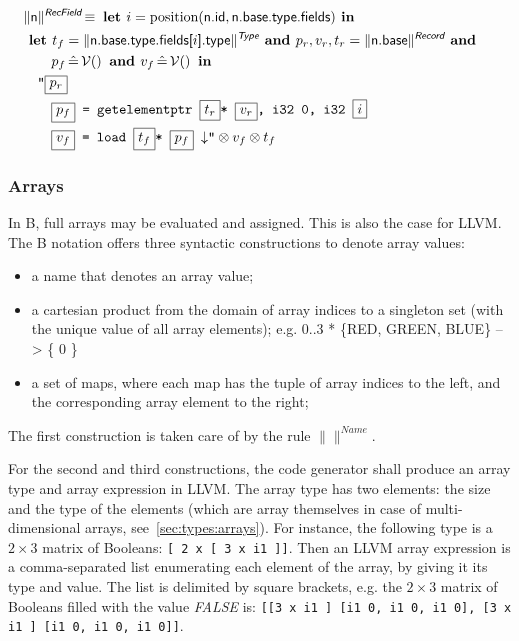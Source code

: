 \documentclass{llncs}
\newcommand{\trad}[2]{\ensuremath{\lVert \textsf{#1} \rVert^{\textit{#2}}}}
\newcommand{\nl}[0]{\ensuremath{\downarrow}}
\DeclareMathOperator{\isdef}{\equiv}
\DeclareMathOperator{\variable}{\mathcal{V}()}
\newcommand{\llvm}[1]{\texttt{#1}}
\newcommand{\B}[1]{\textsf{#1}}
\newcommand{\LET}[0]{\textbf{ let }}
\DeclareMathOperator{\BE}{\hat{=}}
\newcommand{\IN}[0]{\textbf{ in }}
\newcommand{\AND}[0]{\textbf{ and }}
\newcommand{\PH}[1]{\framebox{$#1$}}
\newcommand{\sep}[0]{\otimes}
\begin{document}
\begin{align*}
\lefteqn{\trad{n}{\B{RecField}} \isdef \LET i = \text{position}(\B{n.id}, \B{n.base.type.fields}) \IN} \\
& \LET t_f = \trad{\B{n.base.type.fields[$i$].type}}{\B{Type}} \AND
p_r, v_r, t_r = \trad{\B{n.base}}{\B{Record}} \AND \\
& \quad \quad  p_f \BE \variable \AND v_f \BE \variable \IN \\
& \quad \llvm{"\PH{p_r}} \\
& \quad \quad \llvm{\PH{p_f} = getelementptr \PH{t_r}* \PH{v_r}, i32 0, i32 \PH{i}} \\
& \quad \quad \llvm{\PH{v_f} = load \PH{t_f}* \PH{p_f} \nl"} \sep v_f \sep t_f
\end{align*}

\subsubsection{Arrays}

In B, full arrays may be evaluated and assigned. This is also the case
for LLVM. The B notation offers three syntactic constructions to
denote array values:
\begin{itemize}
\item a name that denotes an array value;
\item a cartesian product from the domain of array indices to a
  singleton set (with the unique value of all array elements); e.g.
  \B{0..3 * \{RED, GREEN, BLUE\} --> \{ 0 \}}
\item a set of maps, where each map has the tuple of array indices to
  the left, and the corresponding array element to the right;
\end{itemize}
The first construction is taken care of by the rule \trad{}{Name}.

For the second and third constructions, the code generator shall
produce an array type and array expression in LLVM. The array type has
two elements: the size and the type of the elements (which are array
themselves in case of multi-dimensional arrays,
see~\ref{sec:types:arrays}). For instance, the following type is a $2
\times 3$ matrix of Booleans: \llvm{[ 2 x [ 3 x i1 ]]}.  Then an LLVM
array expression is a comma-separated list enumerating each element of
the array, by giving it its type and value. The list is delimited by
square brackets, e.g. the $2 \times 3$  matrix of Booleans filled with
the value \textit{FALSE\/} is:
\llvm{[[3 x i1 ] [i1 0, i1 0, i1 0], [3 x i1 ] [i1 0, i1 0, i1 0]]}.
\end{document}
